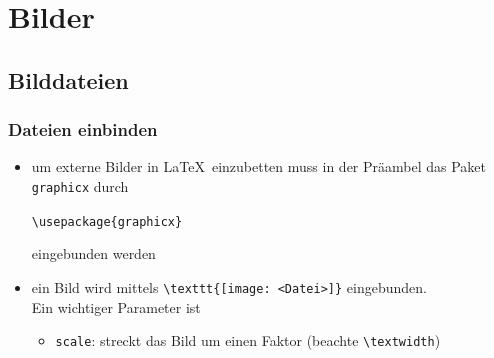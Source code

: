 \section{Bilder}
\subsection{Bilddateien}

\begin{frame}[fragile]
\frametitle{Dateien einbinden}
\begin{itemize}[<+->]
  \item um externe Bilder in \LaTeX\ einzubetten muss in der Präambel das Paket \texttt{graphicx} durch \\
\begin{center}
\lstinline[style=Latex]+\usepackage{graphicx}+
\end{center}
eingebunden werden \vfill
  \item ein Bild wird mittels \lstinline[style=Latex]+\texttt{[image: <Datei>]}+ eingebunden. \\
Ein wichtiger Parameter ist
  \begin{itemize}
    \item \texttt{scale}: streckt das Bild um einen Faktor (beachte \lstinline[style=Latex]+\textwidth+)
  \end{itemize}
\end{itemize}
\end{frame}

